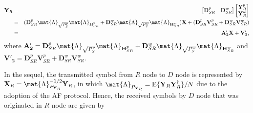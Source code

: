 \begin{eqnarray}
\mathbf{Y}_{R} & = &  \begin{bmatrix} \mathbf{D}_{SR}^{p} & \mathbf{D}_{SR}^{w} \end{bmatrix} \begin{bmatrix} \mathbf{Y}_{R}^p \\ \mathbf{Y}_{R}^w \end{bmatrix} \nonumber\\
& = &  (\mathbf{D}_{SR}^{p}\mat{\Lambda}_{\sqrt{P_{S}^{p}}} \mat{\Lambda}_{\mathbf{H}_{SR}^p} + \mathbf{D}_{SR}^{w}\mat{\Lambda}_{\sqrt{P_{S}^{w}}} \mat{\Lambda}_{\mathbf{H}_{SR}^w}) \mathbf{X}+ (\mathbf{D}_{SR}^{p}\mathbf{V}_{SR}^{p} + \mathbf{D}_{SR}^{w} \mathbf{V}_{SR}^{w}) \nonumber\\
& = &  \mathbf{A'_2} \mathbf{X}+ \mathbf{V'_2},
\end{eqnarray}
where $ \mathbf{A'_2} = \mathbf{D}_{SR}^{p}\mat{\Lambda}_{\sqrt{P_{S}^{p}}} \mat{\Lambda}_{\mathbf{H}_{SR}^p} + \mathbf{D}_{SR}^{w}\mat{\Lambda}_{\sqrt{P_{S}^{w}}} \mat{\Lambda}_{\mathbf{H}_{SR}^w} $ and $ \mathbf{V'_2} = \mathbf{D}_{SR}^{p}\mathbf{V}_{SR}^{p} + \mathbf{D}_{SR}^{w} \mathbf{V}_{SR}^{w} $. 

In the sequel, the transmitted symbol from $R$ node to $D$ node is represented by $ \mathbf{X}_{R} = \mat{\Lambda}_{P_{\mathbf{Y}_{R}}}^{-1/2} \mathbf{Y}_{R} $, in which $\mat{\Lambda}_{P_{\mathbf{Y}_{R}}} = \mathbb{E}\{\mathbf{Y}_{R} \mathbf{Y}_{R}^\dagger\}/N $ due to the adoption of the \ac{AF} protocol. Hence, the received symbols by $D$ node that was originated in $R$ node are given by

